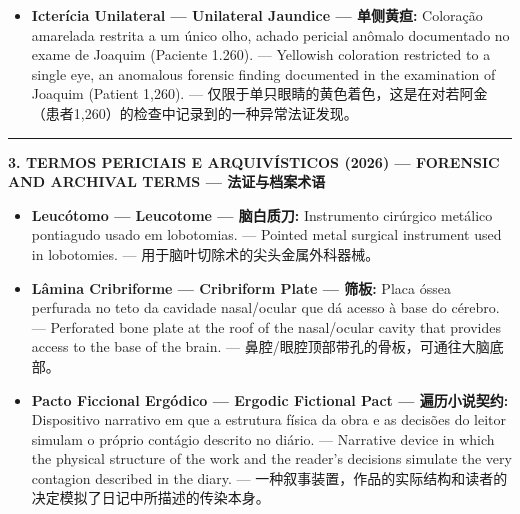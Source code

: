 \begin{itemize}[itemsep=0.3em]
  \item \textbf{Icterícia Unilateral --- Unilateral Jaundice --- 单侧黄疸:} Coloração amarelada restrita a um único olho, achado pericial anômalo documentado no exame de Joaquim (Paciente 1.260). --- Yellowish coloration restricted to a single eye, an anomalous forensic finding documented in the examination of Joaquim (Patient 1,260). --- 仅限于单只眼睛的黄色着色，这是在对若阿金（患者1,260）的检查中记录到的一种异常法证发现。
\end{itemize}

\vspace{0.8em}
\noindent\rule{\textwidth}{0.5pt}
\vspace{0.6em}

\noindent\textbf{3. TERMOS PERICIAIS E ARQUIVÍSTICOS (2026) --- FORENSIC AND ARCHIVAL TERMS --- 法证与档案术语}

\vspace{0.4em}
\begin{itemize}[itemsep=0.3em]
  \item \textbf{Leucótomo --- Leucotome --- 脑白质刀:} Instrumento cirúrgico metálico pontiagudo usado em lobotomias. --- Pointed metal surgical instrument used in lobotomies. --- 用于脑叶切除术的尖头金属外科器械。
  \item \textbf{Lâmina Cribriforme --- Cribriform Plate --- 筛板:} Placa óssea perfurada no teto da cavidade nasal/ocular que dá acesso à base do cérebro. --- Perforated bone plate at the roof of the nasal/ocular cavity that provides access to the base of the brain. --- 鼻腔/眼腔顶部带孔的骨板，可通往大脑底部。
  \item \textbf{Pacto Ficcional Ergódico --- Ergodic Fictional Pact --- 遍历小说契约:} Dispositivo narrativo em que a estrutura física da obra e as decisões do leitor simulam o próprio contágio descrito no diário. --- Narrative device in which the physical structure of the work and the reader's decisions simulate the very contagion described in the diary. --- 一种叙事装置，作品的实际结构和读者的决定模拟了日记中所描述的传染本身。
\end{itemize}

\endgroup
\clearpage
